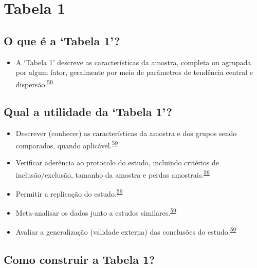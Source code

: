 \documentclass[
]{book}
\providecommand{\tightlist}{%
  \setlength{\itemsep}{0pt}\setlength{\parskip}{0pt}}
\begin{document}
\hypertarget{tabela-1}{%
\section{Tabela 1}\label{tabela-1}}

\hypertarget{o-que-uxe9-a-tabela-1}{%
\subsection{O que é a `Tabela 1'?}\label{o-que-uxe9-a-tabela-1}}

\begin{itemize}
\tightlist
\item
  A `Tabela 1' descreve as características da amostra, completa ou agrupada por algum fator, geralmente por meio de parâmetros de tendência central e dispersão.\textsuperscript{\protect\hyperlink{ref-chen2020}{59}}
\end{itemize}

\hypertarget{qual-a-utilidade-da-tabela-1}{%
\subsection{Qual a utilidade da `Tabela 1'?}\label{qual-a-utilidade-da-tabela-1}}

\begin{itemize}
\item
  Descrever (conhecer) as características da amostra e dos grupos sendo comparados, quando aplicável.\textsuperscript{\protect\hyperlink{ref-chen2020}{59}}
\item
  Verificar aderência ao protocolo do estudo, incluindo critérios de inclusão/exclusão, tamanho da amostra e perdas amostrais.\textsuperscript{\protect\hyperlink{ref-chen2020}{59}}
\item
  Permitir a replicação do estudo.\textsuperscript{\protect\hyperlink{ref-chen2020}{59}}
\item
  Meta-analisar os dados junto a estudos similares.\textsuperscript{\protect\hyperlink{ref-chen2020}{59}}
\item
  Avaliar a generalização (validade externa) das conclusões do estudo.\textsuperscript{\protect\hyperlink{ref-chen2020}{59}}
\end{itemize}

\hypertarget{como-construir-a-tabela-1}{%
\subsection{Como construir a Tabela 1?}\label{como-construir-a-tabela-1}}
\end{document}
